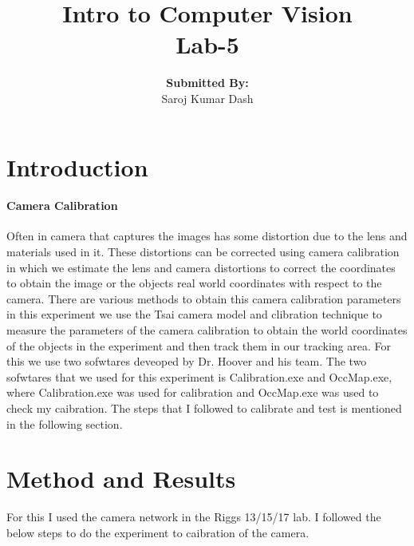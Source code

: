 \documentclass{article}
\title{\textbf{Intro to Computer Vision \\Lab-5}\vfill{}}
\author{\textbf{Submitted By:}\\Saroj Kumar Dash}
\begin{document}
	\begin{titlepage}
		\maketitle
	\end{titlepage}
	
\newpage

\tableofcontents

\newpage	

\section{Introduction}
\paragraph{Camera Calibration}
Often in camera that captures the images has some distortion due to the lens and materials used in it. These distortions can be corrected using camera calibration in which we estimate the lens and camera distortions to correct the coordinates to obtain the image or the objects real world coordinates with respect to the camera. There are various methods to obtain this camera calibration parameters in this experiment we use the Tsai camera model and clibration technique to measure the parameters of the camera calibration to obtain the world coordinates of the objects in the experiment and then track them in our tracking area. For this we use two sofwtares deveoped by Dr. Hoover and his team. The two sofwtares that we used for this experiment is Calibration.exe and OccMap.exe, where Calibration.exe was used for calibration and OccMap.exe was used to check my caibration. The steps that I followed to calibrate and test is mentioned in the following section.

\section{Method and Results}
For this I used the camera network in the Riggs 13/15/17 lab. I followed the below steps to do the experiment to caibration of the camera.
\end{document}
